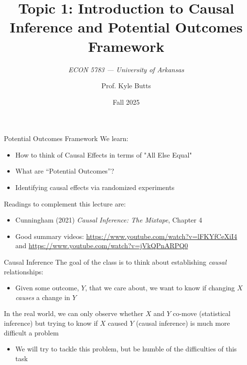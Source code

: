 \documentclass[aspectratio=169,t,11pt,table]{beamer}
\title{Topic 1: Introduction to Causal Inference and Potential Outcomes Framework}
\subtitle{\it  ECON 5783 — University of Arkansas}
\date{Fall 2025}
\author{Prof. Kyle Butts}
\begin{document}
\begin{frame}
  \maketitle

\end{frame}

\begin{frame}{Potential Outcomes Framework}
  We learn:
  \begin{itemize}
    \item How to think of Causal Effects in terms of "All Else Equal"
    \item What are ``Potential Outcomes''?
    \item Identifying causal effects via randomized experiments
  \end{itemize}

  \bigskip
  Readings to complement this lecture are:
  \begin{itemize}
    \item Cunningham (2021) \emph{Causal Inference: The Mixtape}, Chapter 4
    
    \item Good summary videos: \url{https://www.youtube.com/watch?v=lFKYfCeXiI4} and \url{https://www.youtube.com/watch?v=jVkQPnARPQ0}
  \end{itemize}
\end{frame}

\begin{frame}{Causal Inference}
  The goal of the class is to think about establishing \emph{causal} relationships:
  \begin{itemize}
    \item Given some outcome, $Y$, that we care about, we want to know if changing $X$ \emph{causes} a change in $Y$
  \end{itemize}
    
  \pause
  \bigskip
  In the real world, we can only observe whether $X$ and $Y$ co-move (\alert{statistical inference}) but trying to know if $X$ caused $Y$ (\alert{causal inference}) is much more difficult a problem
  \begin{itemize}
    \item We will try to tackle this problem, but be humble of the difficulties of this task
  \end{itemize}
\end{frame}
\end{document}
